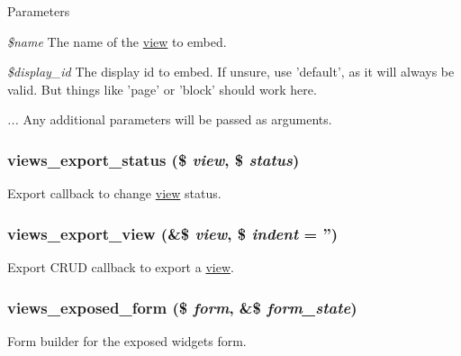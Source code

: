 \begin{DoxyParams}{Parameters}
\item[{\em \$name}]The name of the \hyperlink{classview}{view} to embed. \item[{\em \$display\_\-id}]The display id to embed. If unsure, use 'default', as it will always be valid. But things like 'page' or 'block' should work here. \item[{\em ...}]Any additional parameters will be passed as arguments. \end{DoxyParams}
\hypertarget{views_8module_ad4357e120d4f572aa1f3f12270b9114f}{
\subsubsection[{views\_\-export\_\-status}]{\setlength{\rightskip}{0pt plus 5cm}views\_\-export\_\-status (\$ {\em view}, \/  \$ {\em status})}}
\label{views_8module_ad4357e120d4f572aa1f3f12270b9114f}
Export callback to change \hyperlink{classview}{view} status. \hypertarget{views_8module_aaf41a0a8cdaaa95df87a8287b68fbb12}{
\subsubsection[{views\_\-export\_\-view}]{\setlength{\rightskip}{0pt plus 5cm}views\_\-export\_\-view (\&\$ {\em view}, \/  \$ {\em indent} = {\ttfamily ''})}}
\label{views_8module_aaf41a0a8cdaaa95df87a8287b68fbb12}
Export CRUD callback to export a \hyperlink{classview}{view}. \hypertarget{views_8module_a73e0d571664dc78bbddc65be02bc0a2e}{
\subsubsection[{views\_\-exposed\_\-form}]{\setlength{\rightskip}{0pt plus 5cm}views\_\-exposed\_\-form (\$ {\em form}, \/  \&\$ {\em form\_\-state})}}
\label{views_8module_a73e0d571664dc78bbddc65be02bc0a2e}
Form builder for the exposed widgets form.

